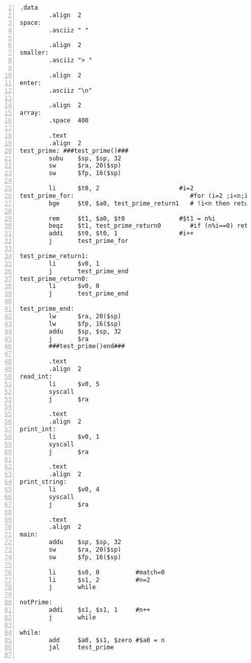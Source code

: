 \documentclass[11pt]{jarticle}
\begin{document}
\begin{lstlisting}[caption=100個の素数を配列に格納,label=100個の素数を配列に格納,numbers=left]
        .data
        .align  2
space:
        .asciiz " "

        .align  2
smaller:
        .asciiz "> "
        
        .align  2
enter:
        .asciiz "\n"

        .align  2
array:
        .space  400
        
        .text
        .align  2
test_prime: ###test_prime()###
        subu    $sp, $sp, 32
        sw      $ra, 20($sp)
        sw      $fp, 16($sp)
        
        li      $t0, 2                      #i=2
test_prime_for:                                #for (i=2 ;i<n;i++)
        bge     $t0, $a0, test_prime_return1   # !i<n then return 1 ;
        
        rem     $t1, $a0, $t0               #$t1 = n%i
        beqz    $t1, test_prime_return0        #if (n%i==0) return 0 ;
        addi    $t0, $t0, 1                 #i++
        j       test_prime_for        
        
test_prime_return1:
        li      $v0, 1
        j       test_prime_end
test_prime_return0:
        li      $v0, 0
        j       test_prime_end
        
test_prime_end:    
        lw      $ra, 20($sp)
        lw      $fp, 16($sp)
        addu    $sp, $sp, 32
        j       $ra
        ###test_prime()end###

        .text
        .align  2
read_int:
        li      $v0, 5
        syscall
        j       $ra
        
        .text
        .align  2
print_int:
        li      $v0, 1
        syscall
        j       $ra

        .text
        .align  2
print_string:
        li      $v0, 4
        syscall
        j       $ra
        
        .text
        .align  2
main:
        addu    $sp, $sp, 32
        sw      $ra, 20($sp)
        sw      $fp, 16($sp)
        
        li      $s0, 0          #match=0
        li      $s1, 2          #n=2
        j       while
        
notPrime:
        addi    $s1, $s1, 1     #n++
        j       while
        
while:
        add     $a0, $s1, $zero #$a0 = n
        jal     test_prime


\end{lstlisting}
\end{document}

